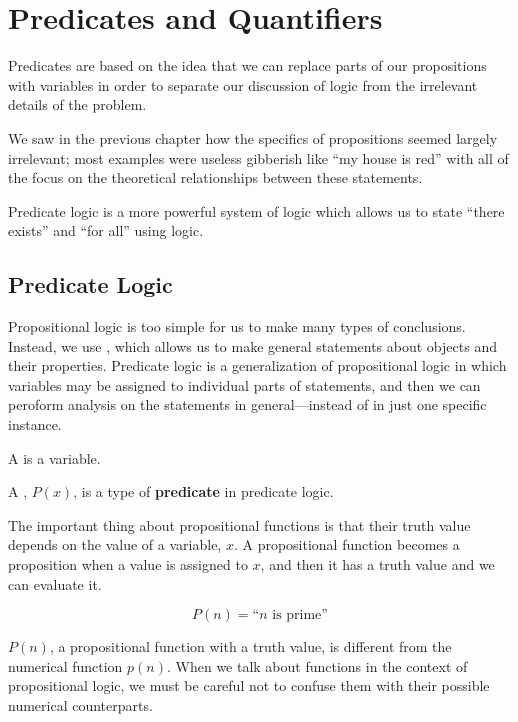 \chapter{Predicates and Quantifiers}
\label{ch:predicates}

Predicates are based on the idea that we can replace parts of our propositions with variables in order to separate our discussion of logic from the irrelevant details of the problem.

We saw in the previous chapter how the specifics of propositions seemed largely irrelevant; most examples were useless gibberish like ``my house is red'' with all of the focus on the theoretical relationships between these statements.

Predicate logic is a more powerful system of logic which allows us to state ``there exists'' and ``for all'' using logic.

\section{Predicate Logic}

Propositional logic is too simple for us to make many types of conclusions.
Instead, we use , which allows us to make general
statements about objects and their properties.
Predicate logic is a generalization of propositional logic in which variables may
be assigned to individual parts of statements, and then we can peroform
analysis on the statements in general---instead of in just one specific instance.

\begin{defn}
A  is a variable.
\end{defn}

\begin{defn}
A ,
$P(x)$, is a
type of \textbf{predicate} in
predicate logic.
\end{defn}

The important thing about propositional functions is that their truth value depends on the value of a variable, $x$.
A propositional function becomes a proposition when a value is assigned to $x$, and then it has a truth value and we can evaluate it.
\begin{ex}
  \[ P(n)=\text{``$n$ is prime''} \]
  \begin{remark}
    $P(n)$, a propositional function with a truth value, is different from the numerical function $p(n)$.
    When we talk about functions in the context of propositional logic, we must be careful not to confuse them with their possible numerical counterparts.
  \end{remark}
\end{ex}


